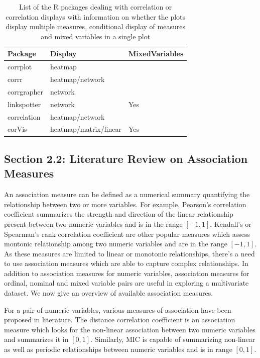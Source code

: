 \begin{Schunk}
\begin{table}

\caption{\label{tab:corrdisplay-packages}List of the R packages dealing with correlation or correlation displays with information on whether the plots display multiple measures, conditional display of measures and mixed variables in a single plot}
\centering
\begin{tabular}[t]{lll}
\toprule
Package & Display & MixedVariables\\
\midrule
corrplot & heatmap & \\
corrr & heatmap/network & \\
corrgrapher & network & \\
linkspotter & network & Yes\\
correlation & heatmap/network & \\
\addlinespace
corVis & heatmap/matrix/linear & Yes\\
\bottomrule
\end{tabular}
\end{table}

\end{Schunk}

\hypertarget{section-2.2-literature-review-on-association-measures}{%
\subsection{Section 2.2: Literature Review on Association
Measures}\label{section-2.2-literature-review-on-association-measures}}

An association measure can be defined as a numerical summary quantifying
the relationship between two or more variables. For example, Pearson's
correlation coefficient summarizes the strength and direction of the
linear relationship present between two numeric variables and is in the
range \([-1,1]\). Kendall's or Spearman's rank correlation coefficient
are other popular measures which assess montonic relationship among two
numeric variables and are in the range \([-1,1]\). As these measures are
limited to linear or monotonic relationships, there's a need to use
association measures which are able to capture complex relationships. In
addition to association measures for numeric variables, association
measures for ordinal, nominal and mixed variable pairs are useful in
exploring a multivariate dataset. We now give an overview of available
association measures.

For a pair of numeric variables, various measures of association have
been proposed in literature. The distance correlation coefficient
\citep{szekely2007measuring} is an association measure which looks for
the non-linear association between two numeric variables and summarizes
it in \([0,1]\). Similarly, MIC \citep{reshef2011detecting} is capable
of summarizing non-linear as well as periodic relationships between
numeric variables and is in range \([0,1]\).

